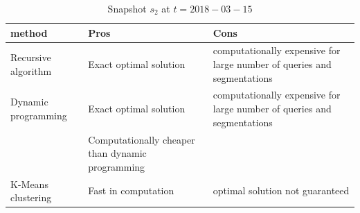 \begin{center}
\begin{table}
	\centering
	\small
	\caption{Snapshot $s_2$ at $t = 2018-03-15$}
	\label{table:segmentation_comparison}
	\begin{tabular}{p{4cm}p{4cm}p{4cm}}
		\hline
		method & Pros  & Cons  \\ \hline
		Recursive algorithm & Exact optimal solution & computationally expensive for large number of queries and segmentations   \\ \hline
		Dynamic programming & Exact optimal solution & computationally expensive for large number of queries and segmentations\\ 
		  & Computationally cheaper than dynamic programming &    \\ \hline
		K-Means clustering & Fast in computation & optimal solution not guaranteed \\ \hline
	\end{tabular}
\end{table}
\end{center}